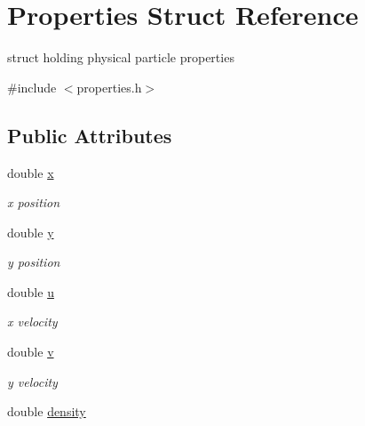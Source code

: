 \hypertarget{structProperties}{\section{\-Properties \-Struct \-Reference}
\label{structProperties}
}


struct holding physical particle properties  




{\ttfamily \#include $<$properties.\-h$>$}

\subsection*{\-Public \-Attributes}
\begin{DoxyCompactItemize}
\item 
\hypertarget{structProperties_a2e6b709c527c9206db00891ad1b83240}{double \hyperlink{structProperties_a2e6b709c527c9206db00891ad1b83240}{x}}\label{structProperties_a2e6b709c527c9206db00891ad1b83240}

\begin{DoxyCompactList}\small\item\em x position \end{DoxyCompactList}\item 
\hypertarget{structProperties_a3a6af08782493b20c894f1a68311b54e}{double \hyperlink{structProperties_a3a6af08782493b20c894f1a68311b54e}{y}}\label{structProperties_a3a6af08782493b20c894f1a68311b54e}

\begin{DoxyCompactList}\small\item\em y position \end{DoxyCompactList}\item 
\hypertarget{structProperties_abc41eaad5d918caa22d09be4fe7e6982}{double \hyperlink{structProperties_abc41eaad5d918caa22d09be4fe7e6982}{u}}\label{structProperties_abc41eaad5d918caa22d09be4fe7e6982}

\begin{DoxyCompactList}\small\item\em x velocity \end{DoxyCompactList}\item 
\hypertarget{structProperties_a1598f451b61d5066887bbe4ed8db07a1}{double \hyperlink{structProperties_a1598f451b61d5066887bbe4ed8db07a1}{v}}\label{structProperties_a1598f451b61d5066887bbe4ed8db07a1}

\begin{DoxyCompactList}\small\item\em y velocity \end{DoxyCompactList}\item 
\hypertarget{structProperties_a8ae0297de69be0dae8b291d9716d68a4}{double \hyperlink{structProperties_a8ae0297de69be0dae8b291d9716d68a4}{density}}\label{structProperties_a8ae0297de69be0dae8b291d9716d68a4}


\end{DoxyCompactItemize}
